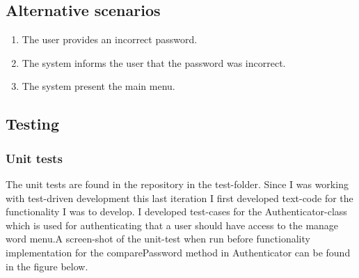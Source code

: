 \documentclass[12pt, letterpaper]{article}
\begin{document}
\subsection{Alternative scenarios}
\begin{enumerate}[label=3.\arabic*]
	\item The user provides an incorrect password.
	\item The system informs the user that the password was incorrect.
	\item The system present the main menu.
\end{enumerate}
\subsection{Testing}
\subsubsection{Unit tests}
The unit tests are found in the repository in the test-folder. 
Since I was working with test-driven development this last iteration I first developed text-code for the functionality I was to develop. I developed test-cases for the Authenticator-class which is used for authenticating that a user should have access to the manage word menu.A screen-shot of the unit-test when run before functionality implementation for the comparePassword method in Authenticator can be found in the figure below.
\end{document}
